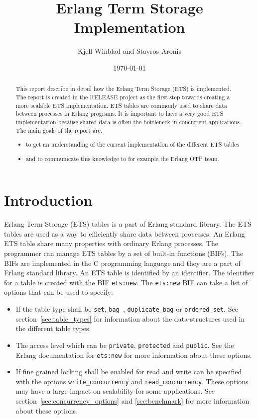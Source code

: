 \documentclass[aps,pre,preprint,nofootinbib]{revtex4}
\begin{document}
\title{Erlang Term Storage Implementation}
\author{Kjell Winblad and Stavros Aronis}
\date{\today}


\begin{abstract}

  This report describe in detail how the Erlang Term Storage (ETS) is implemented.
  The report is created in the RELEASE project as the first step towards creating a more scalable ETS implementation.
  ETS tables are commonly used to share data between processes in Erlang programs.
  It is important to have a very good ETS implementation because shared data is often the bottleneck in concurrent applications.
  The main goals of the report are:
  \begin{itemize}
   \item to get an understanding of the current implementation of the different ETS tables
   \item and to communicate this knowledge to for example the Erlang OTP team. 
  \end{itemize}

\end{abstract}

\maketitle

\section{Introduction}

Erlang Term Storage (ETS) tables is a part of Erlang standard library. 
The ETS tables are used as a way to efficiently share data between processes. 
An Erlang ETS table share many properties with ordinary Erlang processes. 
The programmer can manage ETS tables by a set of built-in functions (BIFs). 
The BIFs are implemented in the C programming language and they are a part of Erlang standard library.
An ETS table is identified by an identifier.
The identifier for a table is created with the BIF \verb|ets:new|.
The \verb|ets:new| BIF can take a list of options that can be used to specify: 

\begin{itemize}
 \item 
 If the table type shall be \verb|set|, \verb|bag |, \verb|duplicate_bag| or \verb|ordered_set|. 
 See section~\ref{sec:table_types} for information about the data-structures used in the different table types.
 \item 
 The access level which can be \verb|private|, \verb|protected| and \verb|public|.
 See the Erlang documentation for \verb|ets:new| for more information about these options.
 \item 
 If fine grained locking shall be enabled for read and write can be specified with the options \verb|write_concurrency| and \verb|read_concurrency|. 
 These options may have a large impact on scalability for some applications.
 See section~\ref{sec:concurrency_options} and \ref{sec:benchmark} for more information about these options.
\end{itemize}
\end{document}
